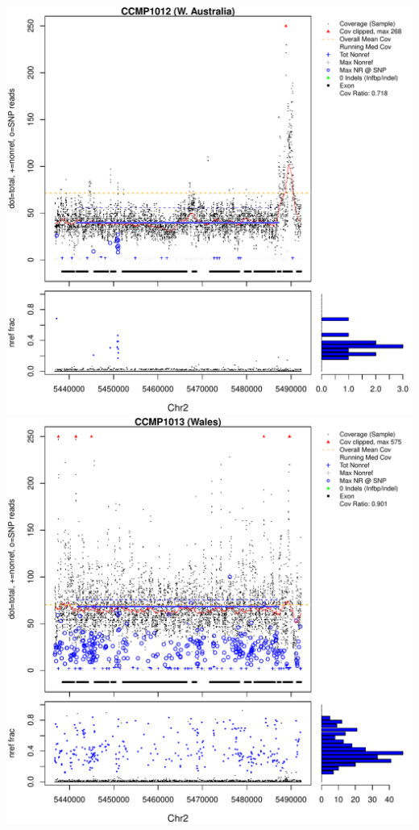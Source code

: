 \documentclass{article}\usepackage[]{graphicx}\usepackage[]{color}
\makeatletter
\def\maxwidth{ %
  \ifdim\Gin@nat@width>\linewidth
    \linewidth
  \else
    \Gin@nat@width
  \fi
}
\newenvironment{knitrout}{}{} %
\makeatother
\begin{document}
\begin{knitrout}
{\includegraphics[width=\maxwidth]{figs-knitr/unnamed-chunk-35-3} 
\includegraphics[width=\maxwidth]{figs-knitr/unnamed-chunk-35-4} 
}
\end{knitrout}
\end{document}
